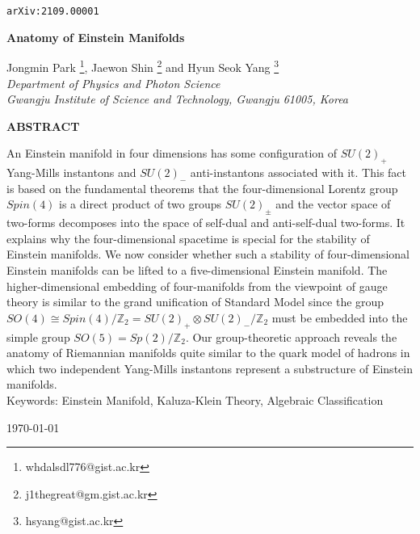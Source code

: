 \documentclass[12pt,epsf]{article}
\begin{document}
\begin{titlepage}


\hfill\parbox{3.7cm} {{\tt arXiv:2109.00001}}


\vspace{15mm}

\begin{center}
{\Large \bf  Anatomy of Einstein Manifolds}



\vspace{10mm}


Jongmin Park \footnote{whdalsdl776@gist.ac.kr}, Jaewon Shin \footnote{j1thegreat@gm.gist.ac.kr}
and Hyun Seok Yang \footnote{hsyang@gist.ac.kr}
\\[10mm]

{\sl Department of Physics and Photon Science \\ Gwangju Institute of Science and Technology, Gwangju 61005, Korea}


\end{center}


\thispagestyle{empty}


\vskip1cm



\centerline{\bf ABSTRACT}
\vskip 4mm
\noindent

An Einstein manifold in four dimensions has some configuration of $SU(2)_+$ Yang-Mills instantons and
$SU(2)_-$ anti-instantons associated with it.
This fact is based on the fundamental theorems that the four-dimensional Lorentz group $Spin(4)$
is a direct product of two groups $SU(2)_\pm$ and the vector space of two-forms decomposes
into the space of self-dual and anti-self-dual two-forms.
It explains why the four-dimensional spacetime is special for the stability of Einstein manifolds.
We now consider whether such a stability of four-dimensional Einstein manifolds
can be lifted to a five-dimensional Einstein manifold.
The higher-dimensional embedding of four-manifolds from the viewpoint of gauge theory
is similar to the grand unification of Standard Model
since the group $SO(4) \cong Spin(4)/\mathbb{Z}_2 = SU(2)_+ \otimes SU(2)_-/\mathbb{Z}_2$
must be embedded into the simple group $SO(5) = Sp(2)/\mathbb{Z}_2$.
Our group-theoretic approach reveals the anatomy of Riemannian manifolds
quite similar to the quark model of hadrons in which two independent Yang-Mills instantons
represent a substructure of Einstein manifolds.
\\


Keywords: Einstein Manifold, Kaluza-Klein Theory, Algebraic Classification


\vspace{1cm}

\today

\end{titlepage}
\end{document}
